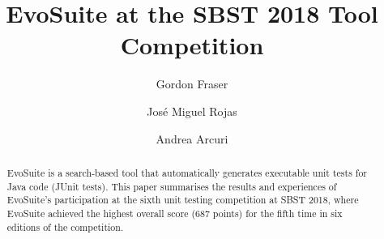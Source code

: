 \documentclass[sigconf,table]{acmart}
\newcommand{\EVOSUITE}{{\sc EvoSuite}\xspace}
\newcommand{\TOTALPOINTS}{{687}\xspace}
\begin{document}
% 

\title{\EVOSUITE at the SBST 2018 Tool Competition}
 

\author{Gordon Fraser}

\author{Jos\'e Miguel Rojas}

\author{Andrea Arcuri}


\renewcommand{\shortauthors}{B. Trovato et al.}


\begin{abstract}
  \EVOSUITE is a search-based tool that automatically generates
  executable unit tests for Java code (JUnit tests).  This paper
  summarises the results and experiences of \EVOSUITE's participation
  at the sixth unit testing competition at SBST 2018, where \EVOSUITE
  achieved the highest overall score (\TOTALPOINTS points) for the
  fifth time in six editions of the competition.
\end{abstract}

\maketitle

\end{document}
